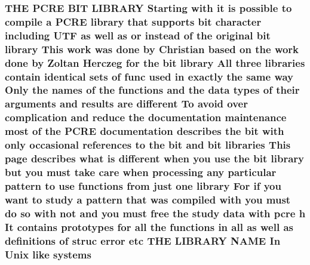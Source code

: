 \subsubsection[{\texorpdfstring{systems}{systems}}]{\setlength{\rightskip}{0pt plus 5cm}T\+HE {\bf P\+C\+RE} {\bf B\+IT} L\+I\+B\+R\+A\+RY Starting {\bf with} {\bf it} {\bf is} {\bf possible} {\bf to} {\bf compile} {\bf a} {\bf P\+C\+RE} {\bf library} that supports {\bf bit} {\bf character} including U\+TF {\bf as} well {\bf as} {\bf or} instead {\bf of} the original {\bf bit} {\bf library} This work was {\bf done} by Christian based {\bf on} the work {\bf done} by Zoltan Herczeg for the {\bf bit} {\bf library} All three {\bf libraries} contain {\bf identical} sets {\bf of} {\bf func} {\bf used} {\bf in} {\bf exactly} the same {\bf way} Only the {\bf names} {\bf of} the {\bf functions} and the {\bf data} {\bf types} {\bf of} their {\bf arguments} and {\bf results} {\bf are} different To avoid over {\bf complication} and reduce the {\bf documentation} {\bf maintenance} most {\bf of} the {\bf P\+C\+RE} {\bf documentation} describes the {\bf bit} {\bf with} only occasional references {\bf to} the {\bf bit} and {\bf bit} {\bf libraries} This page describes {\bf what} {\bf is} different when you use the {\bf bit} {\bf library} but you must take care when processing {\bf any} {\bf particular} {\bf pattern} {\bf to} use {\bf functions} {\bf from} just one {\bf library} For {\bf if} you want {\bf to} {\bf study} {\bf a} {\bf pattern} that was {\bf compiled} {\bf with} you must {\bf do} {\bf so} {\bf with} {\bf not} and you must {\bf free} the {\bf study} {\bf data} {\bf with} {\bf pcre} {\bf h} It {\bf contains} prototypes for {\bf all} the {\bf functions} {\bf in} {\bf all} {\bf as} well {\bf as} definitions {\bf of} struc {\bf error} etc T\+HE L\+I\+B\+R\+A\+RY N\+A\+ME In Unix like systems}\hypertarget{NON-AUTOTOOLS-BUILD_8txt_a1f61b2b3e1ee5392da70ea4a4c1c2dd9}{}\label{NON-AUTOTOOLS-BUILD_8txt_a1f61b2b3e1ee5392da70ea4a4c1c2dd9}
